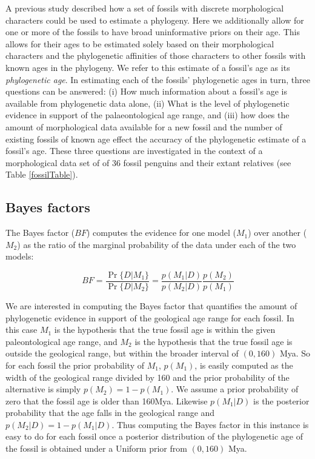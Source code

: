 \documentclass[11pt]{article}
\begin{document}
A previous study described how a set of fossils with discrete morphological characters could be used to estimate a phylogeny. Here we additionally allow for one or more of the fossils to have broad uninformative priors on their age. This allows for their ages to be estimated solely based on their morphological characters and the phylogenetic affinities of those characters to other fossils with known ages in the phylogeny. We refer to this estimate of a fossil's age as its {\em phylogenetic age}. In estimating each of the fossils' phylogenetic ages in turn, three questions can be answered: (i) How much information about a fossil's age is available from phylogenetic data alone, (ii) What is the level of phylogenetic evidence in support of the palaeontological age range, and (iii) how does the amount of morphological data available for a new fossil and the number of existing fossils of known age effect the accuracy of the phylogenetic estimate of a fossil's age. These three questions are investigated in the context of a morphological data set of of 36 fossil penguins and their extant relatives \autocite{gavryushkina2015bayesian} (see Table \ref{fossilTable}).


\subsection*{Bayes factors}

The Bayes factor ($BF$) computes the evidence for one model ($M_1$) over another ($M_2$) as the ratio of the marginal probability of the data under each of the two models:

\begin{equation}
BF = \frac{\Pr\{D|M_1\}}{\Pr\{D|M_2\}} = \frac{p(M_1|D)}{p(M_2|D)}\frac{p(M_2)}{p(M_1)}
\end{equation}

We are interested in computing the Bayes factor that quantifies the amount of phylogenetic evidence in support of the geological age range for each fossil. In this case $M_1$ is the hypothesis that the true fossil age is within the given paleontological age range, and $M_2$ is the hypothesis that the true fossil age is outside the geological range, but within the broader interval of $(0,160)$ Mya. So for each fossil the prior probability of $M_1$, $p(M_1)$, is easily computed as the width of the geological range divided by 160 and the prior probability of the alternative is simply $p(M_2) = 1 - p(M_1)$. We assume a prior probability of zero that the fossil age is older than 160Mya. Likewise $p(M_1 | D)$ is the posterior probability  that the age falls in the geological range and $p(M_2 | D) = 1 - p(M_1 | D)$. Thus computing the Bayes factor in this instance is easy to do for each fossil once a posterior distribution of the phylogenetic age of the fossil is obtained under a Uniform prior from $(0,160)$ Mya.
\end{document}

